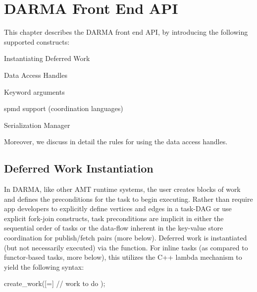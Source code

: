 
\chapter{DARMA Front End API}
\label{chap:front_end}

This chapter describes the DARMA \gls{front end} \gls{API}, 
by introducing the following supported constructs:
\begin{compactitem}
\item Instantiating Deferred Work 
\item Data Access Handles
\item Keyword arguments
\item \gls{spmd} support (coordination languages)
\item Serialization Manager
\end{compactitem}
Moreover, we discuss in detail the rules for using the data access handles.


\section{Deferred Work Instantiation}
\label{sec:deferred}
In DARMA, like other AMT runtime systems, the user creates blocks of work and defines the preconditions for the task to begin executing.
Rather than require app developers to explicitly define vertices and edges in a task-DAG or use explicit fork-join constructs,
task preconditions are implicit in either the sequential order of tasks or the data-flow inherent in the key-value store coordination for publish/fetch pairs (more below).
Deferred work is instantiated (but not necessarily executed) via the  function. 
For inline tasks (as compared to functor-based tasks, more below), this utilizes the C++ lambda mechanism to yield the following syntax:
\begin{CppCode}
  create_work([=]{
    // work to do
  });
\end{CppCode}

